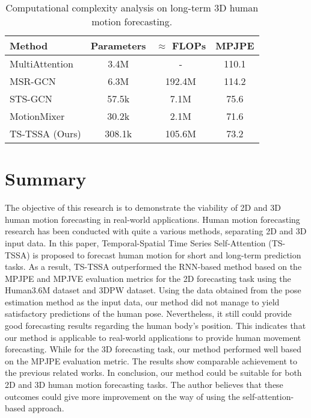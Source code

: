 \begin{table}[!t]
    \centering
    \caption{Computational complexity analysis on long-term 3D human motion forecasting.}
        \begin{tabular}{l|ccc}
        \toprule
           Method  & Parameters & $\approx$ FLOPs & MPJPE \\
        \midrule
            
            MultiAttention~\cite{mao2021multi} & 3.4M & - & 110.1 \\
            MSR-GCN~\cite{msr-gcn} & 6.3M  & 192.4M & 114.2 \\
            STS-GCN~\cite{Sofianos2021}  & 57.5k & 7.1M & 75.6 \\
            MotionMixer~\cite{motionmixer2022}  & 30.2k & 2.1M & 71.6 \\
            TS-TSSA (Ours) & 308.1k & 105.6M & 73.2 \\
        \midrule
    
        \end{tabular} 
    \label{tbl:4_3D_complexity}
\end{table}


\section{Summary}\label{4:summary}
The objective of this research is to demonstrate the viability of 2D and 3D human motion forecasting in real-world applications. Human motion forecasting research has been conducted with quite a various methods, separating 2D and 3D input data. In this paper, Temporal-Spatial Time Series Self-Attention (TS-TSSA) is proposed to forecast human motion for short and long-term prediction tasks. As a result, TS-TSSA outperformed the RNN-based method based on the MPJPE and MPJVE evaluation metrics for the 2D forecasting task using the Human3.6M dataset and 3DPW dataset. Using the data obtained from the pose estimation method as the input data, our method did not manage to yield satisfactory predictions of the human pose. Nevertheless, it still could provide good forecasting results regarding the human body's position. This indicates that our method is applicable to real-world applications to provide human movement forecasting. 
While for the 3D forecasting task, our method performed well based on the MPJPE evaluation metric. The results show comparable achievement to the previous related works. In conclusion, our method could be suitable for both 2D and 3D human motion forecasting tasks. The author believes that these outcomes could give more improvement on the way of using the self-attention-based approach. 

